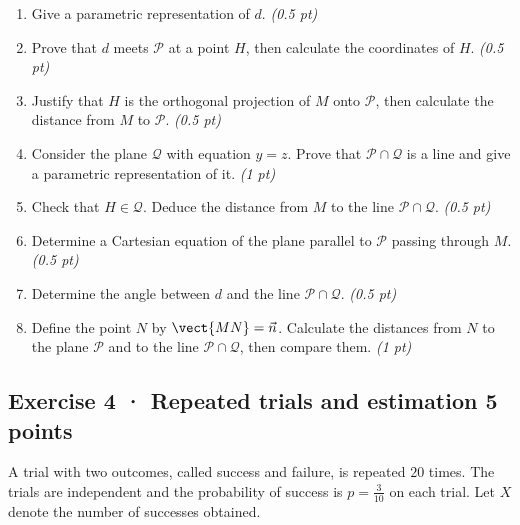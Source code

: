\begin{enumerate}

\item Give a parametric representation of $d$. \hfill\textit{(0.5 pt)}

\item Prove that $d$ meets $\mathcal P$ at a point $H$, then calculate the coordinates of $H$. \hfill\textit{(0.5 pt)}

\item Justify that $H$ is the orthogonal projection of $M$ onto $\mathcal P$, then calculate the distance from $M$ to $\mathcal P$. \hfill\textit{(0.5 pt)}

\item Consider the plane $\mathcal Q$ with equation $y=z$. Prove that $\mathcal P\cap\mathcal Q$ is a line and give a parametric representation of it. \hfill\textit{(1 pt)}

\item Check that $H\in\mathcal Q$. Deduce the distance from $M$ to the line $\mathcal P\cap\mathcal Q$. \hfill\textit{(0.5 pt)}

\item Determine a Cartesian equation of the plane parallel to $\mathcal P$ passing through $M$. \hfill\textit{(0.5 pt)}

\item Determine the angle between $d$ and the line $\mathcal P\cap\mathcal Q$. \hfill\textit{(0.5 pt)}

\item Define the point $N$ by $\vect{MN}=\vec n$. Calculate the distances from $N$ to the plane $\mathcal P$ and to the line $\mathcal P\cap\mathcal Q$, then compare them. \hfill\textit{(1 pt)}

\end{enumerate}

\subsection*{Exercise 4 · Repeated trials and estimation \hfill 5 points}A trial with two outcomes, called success and failure, is repeated $20$ times. The trials are independent and the probability of success is $p=\frac{3}{10}$ on each trial. Let $X$ denote the number of successes obtained.

